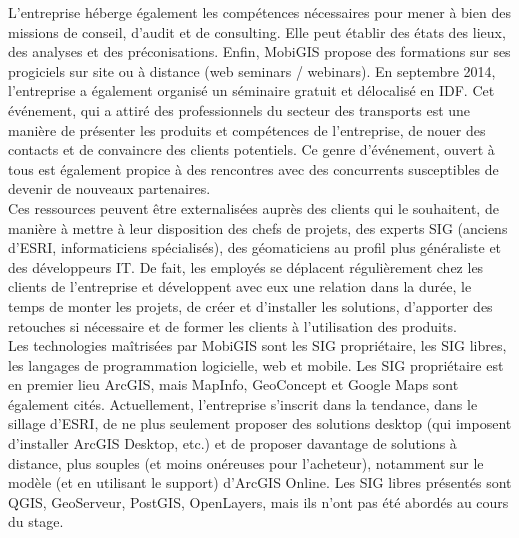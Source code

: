 L’entreprise héberge également les compétences nécessaires pour mener à bien des missions de conseil, d’audit et de consulting. Elle peut établir des états des lieux, des analyses et des préconisations. Enfin, MobiGIS propose des formations sur ses progiciels sur site ou à distance (web seminars / webinars). En septembre 2014, l’entreprise a également organisé un séminaire gratuit et délocalisé en IDF. Cet événement, qui a attiré des professionnels du secteur des transports est une manière de présenter les produits et compétences de l’entreprise, de nouer des contacts et de convaincre des clients potentiels. Ce genre d’événement, ouvert à tous est également propice à des rencontres avec des concurrents susceptibles de devenir de nouveaux partenaires.\\

Ces ressources peuvent être externalisées auprès des clients qui le souhaitent, de manière à mettre à leur disposition des chefs de projets, des experts SIG (anciens d’ESRI, informaticiens spécialisés), des géomaticiens au profil plus généraliste et des développeurs IT. De fait, les employés se déplacent régulièrement chez les clients de l’entreprise et développent avec eux une relation dans la durée, le temps de monter les projets, de créer et d’installer les solutions, d’apporter des retouches si nécessaire et de former les clients à l’utilisation des produits. \\

Les technologies maîtrisées par MobiGIS sont les SIG propriétaire, les SIG libres, les langages de programmation logicielle, web et mobile. Les SIG propriétaire est en premier lieu ArcGIS, mais MapInfo, GeoConcept et Google Maps sont également cités. Actuellement, l’entreprise s’inscrit dans la tendance, dans le sillage d’ESRI, de ne plus seulement proposer des solutions desktop (qui imposent d’installer ArcGIS Desktop, etc.) et de proposer davantage de solutions à distance, plus souples (et moins onéreuses pour l’acheteur), notamment sur le modèle (et en utilisant le support) d’ArcGIS Online. Les SIG libres présentés sont QGIS, GeoServeur, PostGIS, OpenLayers, mais ils n’ont pas été abordés au cours du stage. \\

